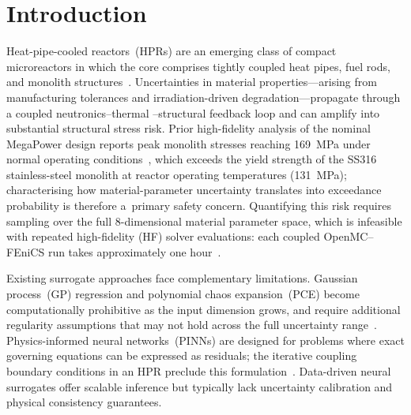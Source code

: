 \documentclass[pdflatex,sn-mathphys-num]{sn-jnl}
\theoremstyle{thmstyleone}
\theoremstyle{thmstyletwo}
\theoremstyle{thmstylethree}
\begin{document}
\maketitle

\section{Introduction}\label{sec:intro}


Heat-pipe-cooled reactors~(HPRs) are an emerging class of compact microreactors
in which the core comprises tightly coupled heat pipes, fuel rods, and monolith
structures~\cite{ref:hpr_design}.
Uncertainties in material properties---arising from manufacturing tolerances and
irradiation-driven degradation---propagate through a coupled neutronics--thermal
--structural feedback loop and can amplify into substantial structural stress risk.
Prior high-fidelity analysis of the nominal MegaPower design reports peak monolith
stresses reaching \SI{169}{MPa} under normal operating conditions~\cite{ref:zhang2025energy},
which exceeds the yield strength of the SS316 stainless-steel monolith at reactor
operating temperatures (\SI{131}{MPa}); characterising how material-parameter
uncertainty translates into exceedance probability is therefore a~primary safety concern.
Quantifying this risk requires sampling over the full 8-dimensional material
parameter space, which is infeasible with repeated high-fidelity (HF) solver
evaluations: each coupled OpenMC--FEniCS run takes approximately one
hour~\cite{ref:openmc,ref:fenics}.


Existing surrogate approaches face complementary limitations.
Gaussian process~(GP) regression and polynomial chaos expansion~(PCE) become
computationally prohibitive as the input dimension grows, and require additional
regularity assumptions that may not hold across the full uncertainty
range~\cite{ref:gp_uq,ref:pce_uq}.
Physics-informed neural networks~(PINNs) are designed for problems where exact
governing equations can be expressed as residuals; the iterative coupling
boundary conditions in an HPR preclude this formulation~\cite{ref:pinn_review}.
Data-driven neural surrogates offer scalable inference but typically lack
uncertainty calibration and physical consistency guarantees.
\end{document}
